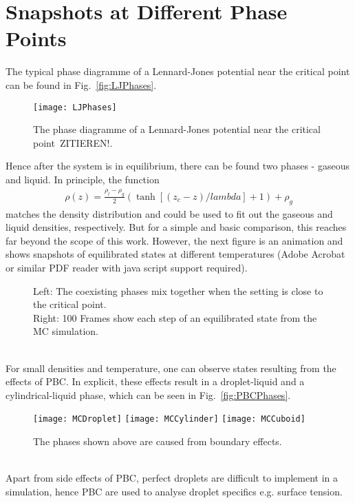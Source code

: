 \section{Snapshots at Different Phase Points}
The typical phase diagramme of a Lennard-Jones potential near the critical point can be found in Fig.~\ref{fig:LJPhases}.
\begin{figure}[h!]
	\centering
	\texttt{[image: LJPhases]}
	\caption[LJ: Phase Diagramme]{The phase diagramme of a Lennard-Jones potential near the critical point~ZITIEREN!.}
\end{figure}
Hence after the system is in equilibrium, there can be found two phases - gaseous and liquid.
In principle, the function
\begin{align}
	\rho(z) = \frac{\rho_l - \rho_g}{2}\left(\tanh\left[(z_c-z)/lambda\right] + 1\right) + \rho_g
\end{align}
matches the density distribution and could be used to fit out the gaseous and liquid densities, respectively.
But for a simple and basic comparison, this reaches far beyond the scope of this work.
However, the next figure is an animation and shows snapshots of equilibrated states at different temperatures (Adobe Acrobat or similar PDF reader with java script support required).
\begin{figure}[h!]
	\centering
	\begin{minipage}[t]{\textwidth}
		\begin{minipage}[t]{0.4\textwidth}
			\centering
		\end{minipage}
		\hspace{2cm}
		\begin{minipage}[t]{0.4\textwidth}
			\centering
		\end{minipage}
	\end{minipage}
	\caption[LJ Potential: Coexisting Phases at different temperatures]{Left: The coexisting phases mix together when the setting is close to the critical point.\\
	Right: 100 Frames show each step of an equilibrated state from the MC simulation.}
\end{figure}\\
For small densities and temperature, one can observe states resulting from the effects of PBC.
In explicit, these effects result in a droplet-liquid and a cylindrical-liquid phase, which can be seen in Fig.~\ref{fig:PBCPhases}.
\begin{figure}[ht]
	\centering
	\texttt{[image: MCDroplet]}
	\texttt{[image: MCCylinder]}
	\texttt{[image: MCCuboid]}
	\caption[PBC: Phases Caused from Boundary Effects]{The phases shown above are caused from boundary effects.}
\end{figure}\\
Apart from side effects of PBC, perfect droplets are difficult to implement in a simulation, hence PBC are used to analyse droplet specifics e.g. surface tension.
